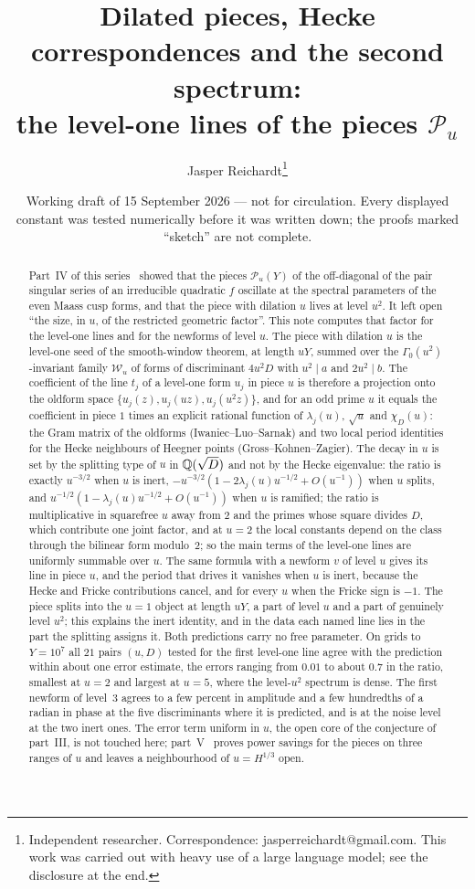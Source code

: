 \documentclass[11pt,a4paper]{article}
\title{Dilated pieces, Hecke correspondences and the second spectrum:\\ the level-one lines of the pieces $\mathcal P_u$}
\author{Jasper Reichardt\thanks{Independent researcher. Correspondence: jasperreichardt@gmail.com. This work was
carried out with heavy use of a large language model; see the disclosure at the end.}}
\date{Working draft of 15 September 2026 --- not for circulation. Every displayed constant was tested numerically before
it was written down; the proofs marked ``sketch'' are not complete.}
\theoremstyle{remark}\newtheorem{remark}[theorem]{Remark}
\begin{document}
\maketitle

\begin{abstract}
Part~IV of this series~\cite{ReichardtIV} showed that the pieces $\mathcal P_u(Y)$ of the off-diagonal of the pair
singular series of an irreducible quadratic $f$ oscillate at the spectral parameters of the even Maass cusp forms, and
that the piece with dilation $u$ lives at level $u^2$. It left open ``the size, in $u$, of the restricted geometric
factor''. This note computes that factor for the level-one lines and for the newforms of level $u$. The piece with
dilation $u$ is the level-one seed of the smooth-window theorem, at length $uY$, summed over the $\Gamma_0(u^2)$-invariant
family $\mathcal W_u$ of forms of discriminant $4u^2D$ with $u^2\mid a$ and $2u^2\mid b$. The coefficient of the line $t_j$ of
a level-one form $u_j$ in piece $u$ is therefore a projection onto the oldform space $\{u_j(z),u_j(uz),u_j(u^2z)\}$, and
for an odd prime $u$ it equals the coefficient in piece $1$ times an explicit rational function of $\lambda_j(u)$,
$\sqrt u$ and $\chi_D(u)$: the Gram matrix of the oldforms (Iwaniec--Luo--Sarnak) and two local period identities for the
Hecke neighbours of Heegner points (Gross--Kohnen--Zagier). The decay in $u$ is set by the splitting type of $u$ in
$\mathbb Q(\sqrt D)$ and not by the Hecke eigenvalue: the ratio is exactly $u^{-3/2}$ when $u$ is inert, $-u^{-3/2}(1-2\lambda_j(u)u^{-1/2}+O(u^{-1}))$
when $u$ splits, and $u^{-1/2}(1-\lambda_j(u)u^{-1/2}+O(u^{-1}))$ when $u$ is ramified; the ratio is multiplicative in squarefree
$u$ away from $2$ and the primes whose square divides $D$, which contribute one joint factor, and at $u=2$ the local constants depend on the class through the bilinear form modulo~$2$; so the main terms of the level-one lines
are uniformly summable over $u$. The same formula with a newform $v$ of level $u$ gives its line in piece $u$, and the
period that drives it vanishes when $u$ is inert, because the Hecke and Fricke contributions cancel, and for every $u$ when the
Fricke sign is $-1$. The piece splits into the $u=1$ object at length $uY$, a part of level $u$ and a part of genuinely level $u^2$;
this explains the inert identity, and in the data each named line lies in the part the splitting assigns it. Both predictions carry
no free parameter. On grids to $Y=10^7$ all $21$ pairs $(u,D)$ tested for the first level-one line agree with the prediction within
about one error estimate, the errors ranging from $0.01$ to about $0.7$ in the ratio, smallest at $u=2$ and largest at $u=5$, where
the level-$u^2$ spectrum is dense. The first newform of level~$3$ agrees to a few percent in amplitude and a few hundredths of a
radian in phase at the five discriminants where it is predicted, and is at the noise level at the two inert ones. The error term uniform in $u$, the open core of the
conjecture of part~III, is not touched here; part~V~\cite{ReichardtV} proves power savings for the pieces on three ranges of $u$ and leaves a neighbourhood of $u=H^{1/3}$ open.
\end{abstract}
\end{document}
